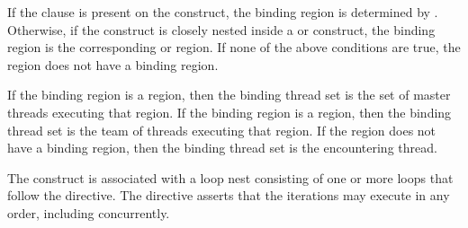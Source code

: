 
%

\binding

If the  clause is present on the construct, the binding region is
determined by . Otherwise, if the  construct is closely
nested inside a  or  construct, the binding region
is the corresponding  or  region. If none of the
above conditions are true, the  region does not have a binding region.

If the binding region is a  region, then the binding thread set is
the set of master threads executing that region. If the binding region is a
 region, then the binding thread set is the team of threads
executing that region. If the  region does not have a binding
region, then the binding thread set is the encountering thread.



\descr

The  construct is associated with a loop nest consisting of one or
more loops that follow the directive. The directive asserts that the iterations
may execute in any order, including concurrently.


